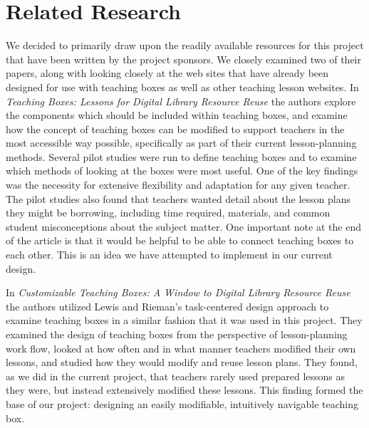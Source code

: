 \documentclass[10pt,letter,titlepage]{article}
\begin{document}
\section{Related Research}
We decided to primarily draw upon the readily available resources for this
project that have been written by the project sponsors.  We closely examined two
of their papers, along with looking closely at the web sites that have already
been designed for use with teaching boxes as well as other teaching lesson
websites.  In \textit{Teaching Boxes: Lessons for Digital Library Resource
Reuse} \cite{bib:khan-maull} the authors explore the components which should be
included within teaching boxes, and examine how the concept of teaching boxes
can be modified to support teachers in the most accessible way possible,
specifically as part of their current lesson-planning methods.  Several pilot
studies were run to define teaching boxes and to examine which methods of
looking at the boxes were most useful.  One of the key findings was the
necessity for extensive flexibility and adaptation for any given teacher.  The
pilot studies also found that teachers wanted detail about the lesson plans they
might be borrowing, including time required, materials, and common student
misconceptions about the subject matter.  One important note at the end of the
article is that it would be helpful to be able to connect teaching boxes to each
other.  This is an idea we have attempted to implement in our current design.

In \textit{Customizable Teaching Boxes: A Window to Digital Library Resource
Reuse} \cite{bib:khan-maull2} the authors utilized Lewis and Rieman's
task-centered design approach to examine teaching boxes in a similar fashion
that it was used in this project.  They examined the design of teaching boxes
from the perspective of lesson-planning work flow, looked at how often and in
what manner teachers modified their own lessons, and studied how they would
modify and reuse lesson plans.  They found, as we did in the current project,
that teachers rarely used prepared lessons as they were, but instead extensively
modified these lessons.  This finding formed the base of our project: designing
an easily modifiable, intuitively navigable teaching box.
\end{document}
